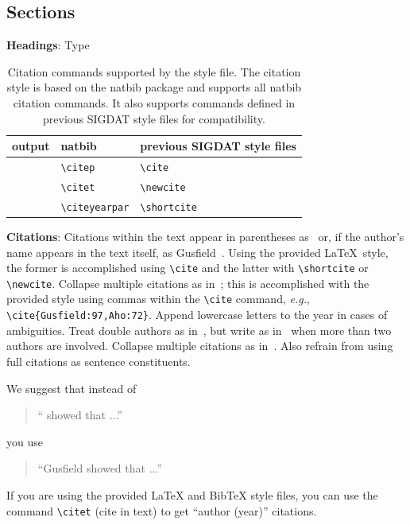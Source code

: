 \documentclass[11pt,a4paper]{article}
\newcommand\conforg{SIGDAT}
\begin{document}
\subsection{Sections}

{\bf Headings}: Type 

\begin{table}[t!]
\centering
\begin{tabular}{lll}
  output & natbib & previous \conforg{} style files\\
  \hline
  \citep{Gusfield:97} & \verb|\citep| & \verb|\cite| \\
  \citet{Gusfield:97} & \verb|\citet| & \verb|\newcite| \\
  \citeyearpar{Gusfield:97} & \verb|\citeyearpar| & \verb|\shortcite| \\
\end{tabular}
\caption{Citation commands supported by the style file.
  The citation style is based on the natbib package and
  supports all natbib citation commands.
  It also supports commands defined in previous \conforg{} style files
  for compatibility.
  }
\end{table}

{\bf Citations}: Citations within the text appear in parentheses
as~\cite{Gusfield:97} or, if the author's name appears in the text
itself, as Gusfield~.
Using the provided \LaTeX\ style, the former is accomplished using
{\small\verb|\cite|} and the latter with {\small\verb|\shortcite|} or {\small\verb|\newcite|}. Collapse multiple citations as in~\cite{Gusfield:97,Aho:72}; this is accomplished with the provided style using commas within the {\small\verb|\cite|} command, {\em e.g.}, {\small\verb|\cite{Gusfield:97,Aho:72}|}. Append lowercase letters to the year in cases of ambiguities.  
 Treat double authors as
in~\cite{Aho:72}, but write as in~\cite{Chandra:81} when more than two
authors are involved. Collapse multiple citations as
in~\cite{Gusfield:97,Aho:72}. Also refrain from using full citations
as sentence constituents.

We suggest that instead of
\begin{quote}
  ``\cite{Gusfield:97} showed that ...''
\end{quote}
you use
\begin{quote}
``Gusfield    showed that ...''
\end{quote}

If you are using the provided \LaTeX{} and Bib\TeX{} style files, you
can use the command \verb|\citet| (cite in text)
to get ``author (year)'' citations.
\end{document}
